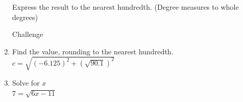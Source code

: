 \begin{enumerate}
\newpage
Express the result to the nearest hundredth. (Degree measures to whole degrees)

Challenge
\item Find the value, rounding to the nearest hundredth.\\[0.25cm]
$c=\sqrt{(-6.125)^2+(\sqrt{90.1})^2}$
\vspace{2cm}

\item Solve for $x$\\[0.25cm]
 $7=\sqrt{6x-11}$

\end{enumerate}

